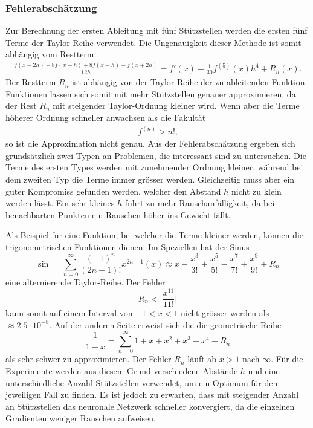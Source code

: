 \subsubsection{Fehlerabschätzung}
Zur Berechnung der ersten Ableitung mit fünf Stützstellen werden die ersten fünf Terme der Taylor-Reihe verwendet. Die Ungenauigkeit dieser Methode ist somit abhängig vom Restterm
\begin{align}
\frac{f(x-2h) - 8f(x-h) + 8f(x-h) - f(x+2h)}{12h} = f'(x) - \frac{1}{30} f^{(5)} (x)h^{4}+R_n(x) \text{.}
\label{ableitung:eqn:error}
\end{align}
Der Restterm $R_{n}$ ist abhängig von der Taylor-Reihe der zu ableitenden Funktion. Funktionen lassen sich somit mit mehr Stützstellen genauer approximieren, da der Rest $R_n$ mit steigender Taylor-Ordnung kleiner wird. Wenn aber die Terme höherer Ordnung schneller anwachsen als die Fakultät
\begin{align}
	f^{(n)} > n! \text{,}
	\label{eqn:fakult}
\end{align}
so ist die Approximation nicht genau.
Aus der Fehlerabschätzung ergeben sich grundsätzlich zwei Typen an Problemen, die interessant sind zu untersuchen.
Die Terme des ersten Types werden mit zunehmender Ordnung kleiner, während bei dem zweiten Typ die Terme immer grösser werden.
Gleichzeitig muss aber ein guter Kompromiss gefunden werden, welcher den Abstand $h$ nicht zu klein werden lässt. Ein sehr kleines $h$ führt zu mehr Rauschanfälligkeit, da bei benachbarten Punkten ein Rauschen höher ins Gewicht fällt.

Als Beispiel für eine Funktion, bei welcher die Terme kleiner werden, können die trigonometrischen Funktionen dienen. Im Speziellen hat der Sinus
\begin{equation}
	\sin = \sum _{n=0}^{\infty }{\frac {(-1)^{n}}{(2n+1)!}}x^{2n+1} \left(x\right)\approx x-{\frac {x^{3}}{3!}}+{\frac {x^{5}}{5!}}-{\frac {x^{7}}{7!}}+{\frac{x^9}{9!}}+R_n
\end{equation}
eine alternierende Taylor-Reihe. Der Fehler
\begin{equation}
R_n < \biggl| {\frac{x^{11}}{11!} \biggr|}
\end{equation}
kann somit auf einem Interval von $-1<x<1$ nicht grösser werden als $\approx 2.5 \cdot 10^{-8}$.
Auf der anderen Seite erweist sich die die geometrische Reihe
\begin{equation}
	\frac{1}{1-x} = \sum _{n=0}^{\infty} 1 + x + x^2 + x^3 + x^4 + R_n
\end{equation}
als sehr schwer zu approximieren. Der Fehler $R_n$ läuft ab $x>1$ nach $\infty$.
Für die Experimente werden aus diesem Grund verschiedene Abstände $h$ und eine unterschiedliche Anzahl Stützstellen verwendet, um ein Optimum für den jeweiligen Fall zu finden. Es ist jedoch zu erwarten, dass mit steigender Anzahl an Stützstellen das neuronale Netzwerk schneller konvergiert, da die einzelnen Gradienten weniger Rauschen aufweisen.